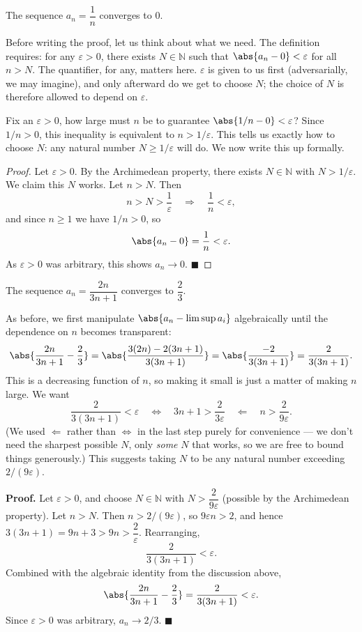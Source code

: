 \begin{example}
The sequence $a_n = \dfrac{1}{n}$ converges to $0$.

\hrulebar

Before writing the proof, let us think about what
we need. The definition requires: for any $\varepsilon > 0$, there exists
$N \in \mathbb{N}$ such that $\abs{a_n - 0} < \varepsilon$ for all $n > N$. The
quantifier, for any, matters here. $\varepsilon$ is given to us first (adversarially, we may
imagine), and only afterward do we get to choose $N$; the choice of $N$ is
therefore allowed to depend on $\varepsilon$.

Fix an $\varepsilon > 0$, how large must $n$ be to guarantee
$\abs{1/n - 0} < \varepsilon$? Since $1/n > 0$, this inequality is equivalent to
$n > 1/\varepsilon$. This tells us exactly how to choose $N$: any natural
number $N \geq 1/\varepsilon$ will do. We now write this up formally.

\begin{proof} Let $\varepsilon > 0$. By the Archimedean property,
there exists $N \in \mathbb{N}$ with $N > 1/\varepsilon$. We claim this $N$
works. Let $n > N$. Then
\[
n > N > \frac{1}{\varepsilon} \quad\Longrightarrow\quad \frac{1}{n} < \varepsilon,
\]
and since $n \geq 1$ we have $1/n > 0$, so
\[
\abs{a_n - 0} = \frac{1}{n} < \varepsilon.
\]
As $\varepsilon > 0$ was arbitrary, this shows $a_n \to 0$. $\blacksquare$
\end{proof}

\end{example}


\begin{example}
The sequence $a_n = \dfrac{2n}{3n+1}$ converges to $\dfrac{2}{3}$.

\hrulebar

As before, we first manipulate $\abs{a_n - \limsup a_i}$
algebraically until the dependence on $n$ becomes transparent:
\[
\abs{\frac{2n}{3n+1} - \frac{2}{3}}
= \abs{\frac{3(2n) - 2(3n+1)}{3(3n+1)}}
= \abs{\frac{-2}{3(3n+1)}}
= \frac{2}{3(3n+1)}.
\]
This is a decreasing function of $n$, so making it small is just a matter of
making $n$ large. We want
\[
\frac{2}{3(3n+1)} < \varepsilon
\quad\Longleftrightarrow\quad
3n + 1 > \frac{2}{3\varepsilon}
\quad\Longleftarrow\quad
n > \frac{2}{9\varepsilon}.
\]
(We used $\Longleftarrow$ rather than $\Longleftrightarrow$ in the last step
purely for convenience — we don't need the sharpest possible $N$, only
\emph{some} $N$ that works, so we are free to bound things generously.) This
suggests taking $N$ to be any natural number exceeding $2/(9\varepsilon)$.

\medskip
\noindent\textbf{Proof.} Let $\varepsilon > 0$, and choose $N \in \mathbb{N}$
with $N > \dfrac{2}{9\varepsilon}$ (possible by the Archimedean property). Let
$n > N$. Then $n > 2/(9\varepsilon)$, so $9\varepsilon n > 2$, and hence
$3(3n+1) = 9n + 3 > 9n > \dfrac{2}{\varepsilon}$. Rearranging,
\[
\frac{2}{3(3n+1)} < \varepsilon.
\]
Combined with the algebraic identity from the discussion above,
\[
\abs{\frac{2n}{3n+1} - \frac{2}{3}} = \frac{2}{3(3n+1)} < \varepsilon.
\]
Since $\varepsilon > 0$ was arbitrary, $a_n \to 2/3$. $\blacksquare$
\end{example}


